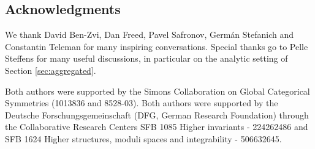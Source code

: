 \subsection*{Acknowledgments}

We thank David Ben-Zvi, Dan Freed, Pavel Safronov, Germ\'an Stefanich and Constantin Teleman
for many inspiring conversations. Special thanks go to Pelle Steffens for many useful
discussions, in particular on the analytic setting of Section \ref{sec:aggregated}.

Both authors were supported by the Simons Collaboration on Global Categorical Symmetries
(1013836 and 8528-03).
Both authors were supported by the Deutsche Forschungsgemeinschaft (DFG, German Research
Foundation) through the Collaborative Research Centers SFB 1085 Higher invariants -
224262486 and SFB 1624 Higher structures, moduli spaces and integrability - 506632645.

